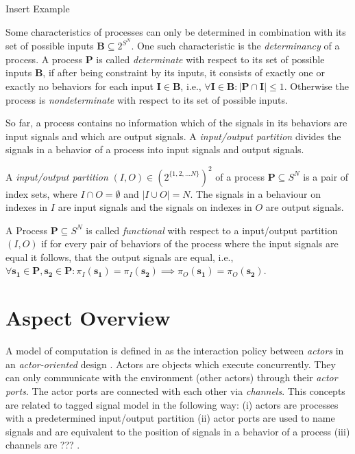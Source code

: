 Insert Example

Some characteristics of processes can only be determined in combination with
its set of possible inputs $\mathbf{B} \subseteq 2^{S^N}$.
One such characteristic is the \emph{determinancy} of a process.
A process $\mathbf{P}$ is called \emph{determinate} with respect
to its set of possible inputs $\mathbf{B}$, if after being
constraint by its inputs, it consists of exactly one or exactly
no behaviors for each input $\mathbf{I} \in \mathbf{B}$,
i.e., $\forall{\mathbf{I} \in \mathbf{B}}: |\mathbf{P} \cap \mathbf{I}| \le 1$.
Otherwise the process is \emph{nondeterminate} with respect
to its set of possible inputs.

So far, a process contains no information which of the signals in its behaviors are
input signals and which are output signals. A \emph{input/output partition}
divides the signals in a behavior of a process into input signals and output signals.
\begin{sdefinition}
A \emph{input/output partition} $(I,O) \in (2^{\{1,2, \ldots N\}})^2$
of a process $\mathbf{P} \subseteq S^N$ is a pair of index sets,
where $I \cap O = \emptyset$ and $|I \cup O| = N$. The signals in
a behaviour on indexes in $I$ are input signals and the
signals on indexes in $O$ are output signals.
\end{sdefinition}
A Process $\mathbf{P} \subseteq S^N$ is called \emph{functional} with
respect to a input/output partition $(I,O)$ if for every pair of
behaviors of the process where the input signals are equal it follows,
that the output signals are equal,
i.e., $\forall{\mathbf{s_1} \in \mathbf{P}, \mathbf{s_2} \in \mathbf{P}}:
\pi{}_{I}(\mathbf{s_1}) = \pi{}_{I}(\mathbf{s_2}) \implies \pi{}_{O}(\mathbf{s_1}) = \pi{}_{O}(\mathbf{s_2})$.


\section{Aspect Overview}\label{aspect-overview}

A model of computation is defined in \cite{embsft:2002} as the
interaction policy between \emph{actors} in an \emph{actor-oriented} design
\cite{agha97abstracting:1997}. Actors are objects which execute concurrently. They can only
communicate with the environment (other actors) through their \emph{actor ports}.
The actor ports are connected with each other via \emph{channels}.
This concepts are related to tagged signal model in the following way:
(i) actors are processes with a predetermined input/output partition
(ii) actor ports are used to name signals and are equivalent to the position of signals in
a behavior of a process
(iii) channels are ??? .

